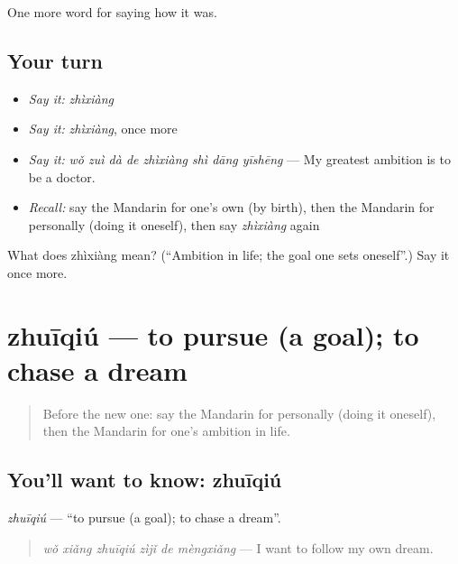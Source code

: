 \begin{grammarlens}[title={What you've built}]
One more word for saying how it was.
\end{grammarlens}

\subsection*{Your turn}
\begin{itemize}
\raggedright
  \item \emph{Say it:} \emph{zhìxiàng}
  \item \emph{Say it:} \emph{zhìxiàng}, once more
  \item \emph{Say it:} \emph{wǒ zuì dà de zhìxiàng shì dāng yīshēng} — My greatest ambition is to be a doctor.
  \item \emph{Recall:} say the Mandarin for one's own (by birth), then the Mandarin for personally (doing it oneself), then say \emph{zhìxiàng} again
\end{itemize}

\begin{tcolorbox}[breakable,colback=teal!4,colframe=teal!35!black,title={Before you move on}]
What does zhìxiàng mean? (\textquotedblleft{}Ambition in life; the goal one sets oneself\textquotedblright{}.) Say it once more.
\end{tcolorbox}
\section[zhuīqiú]{zhuīqiú — to pursue (a goal); to chase a dream}

\label{lesson:ZH-C512-zhuiqiu}



\begin{quote}
Before the new one: say the Mandarin for personally (doing it oneself), then the Mandarin for one's ambition in life.
\end{quote}

\subsection*{You'll want to know: zhuīqiú}
\emph{zhuīqiú} — \textquotedblleft{}to pursue (a goal); to chase a dream\textquotedblright{}.

\begin{quote}
\emph{wǒ xiǎng zhuīqiú zìjǐ de mèngxiǎng} — I want to follow my own dream.
\end{quote}

